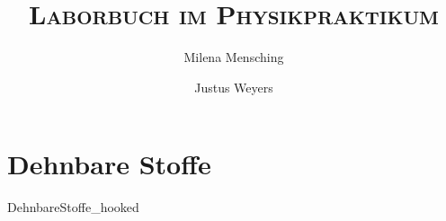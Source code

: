 

\title{\textsc{Laborbuch im Physikpraktikum}}
\author{Milena Mensching \and Justus Weyers}


	\maketitle
	\newpage	
    \tableofcontents
    \newpage
    
    \part{Dehnbare Stoffe}
	{DehnbareStoffe_hooked}
	
	
	\newpage
    
    
	\newpage
	\listoffigures
	\listoftables

